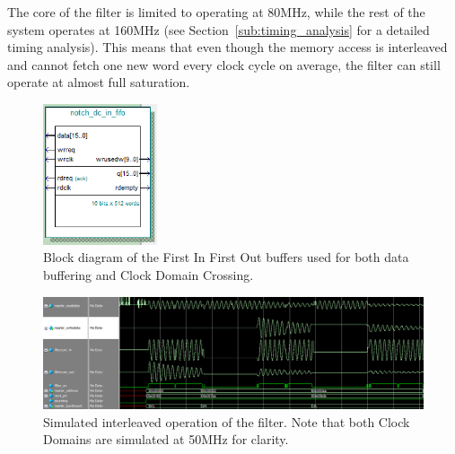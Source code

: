 \documentclass[]{article}
\begin{document}
The core of the filter is limited to operating at 80MHz, while the rest of the system operates at 160MHz (see Section~\ref{sub:timing_analysis} for a detailed timing analysis). This means that even though the memory access is interleaved and cannot fetch one new word every clock cycle on average, the filter can still operate at almost full saturation.

\begin{figure}[!b]
	\begin{center}
		\includegraphics[width = 0.3\textwidth]{fifoBlock.PNG}
	\end{center}
	\caption{Block diagram of the First In First Out buffers used for both data buffering and Clock Domain Crossing.}
	\label{fig:fifoblock}
\end{figure}

\begin{figure}[!b]
	\begin{center}
		\includegraphics[width = \textwidth]{notchfilter_read_and_write_cropped.png}
	\end{center}
	\caption{Simulated interleaved operation of the filter. Note that both Clock Domains are simulated at 50MHz for clarity.}
	\label{fig:interleaved_sim}
\end{figure}
\end{document}
